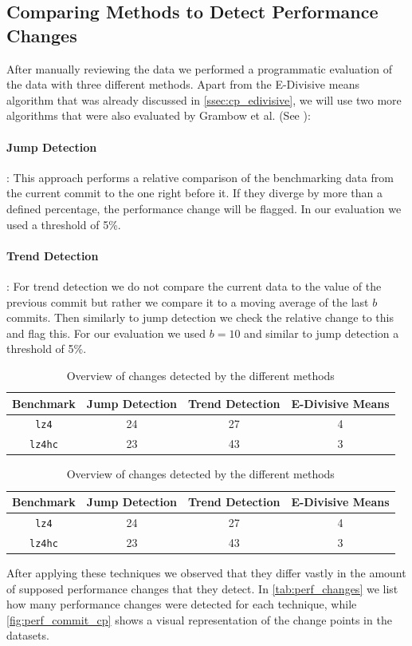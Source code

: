 \documentclass[	runningheads,
				a4paper]{llncs}
\begin{document}
\subsection{Comparing Methods to Detect Performance Changes}
After manually reviewing the data we performed a programmatic evaluation of the data with three different methods. Apart from the E-Divisive means algorithm that was already discussed in \autoref{ssec:cp_edivisive}, we will use two more algorithms that were also evaluated by Grambow et al. (See \cite{grambow2019}):

\paragraph{Jump Detection}: This approach performs a relative comparison of the benchmarking data from the current commit to the one right before it. If they diverge by more than a defined percentage, the performance change will be flagged. In our evaluation we used a threshold of 5\%.

\paragraph{Trend Detection}: For trend detection we do not compare the current data to the value of the previous commit but rather we compare it to a moving average of the last $b$ commits. Then similarly to jump detection we check the relative change to this and flag this. For our evaluation we used $b=10$ and similar to jump detection a threshold of 5\%.

\begin{table}
	\centering
	\begin{tabular}{|c||c|c|c|}
		\hline
		\textbf{Benchmark}&\textbf{Jump Detection}&\textbf{Trend Detection}&\textbf{E-Divisive Means}
		\\\hline\hline
		\texttt{lz4}&24&27&4
		\\\hline
		\texttt{lz4hc}&23&43&3
		\\\hline
	\end{tabular}
	\caption{Overview of changes detected by the different methods}
\end{table}

\begin{table}
	\centering
	\begin{tabular}{|c||c|c|c|}
		\hline
		\textbf{Benchmark}&\textbf{Jump Detection}&\textbf{Trend Detection}&\textbf{E-Divisive Means}
		\\\hline\hline
		\texttt{lz4}&24&27&4
		\\\hline
		\texttt{lz4hc}&23&43&3
		\\\hline
	\end{tabular}
	\caption{Overview of changes detected by the different methods}
\end{table}
After applying these techniques we observed that they differ vastly in the amount of supposed performance changes that they detect. In \autoref{tab:perf_changes} we list how many performance changes were detected for each technique, while \autoref{fig:perf_commit_cp} shows a visual representation of the change points in the datasets.
\end{document}
